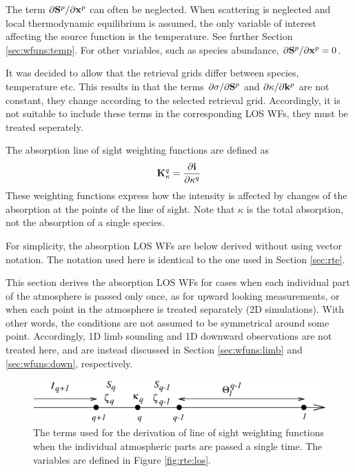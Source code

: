   The term $\partial \mathbf{S}^p/\partial \mathbf{x}^p$ can often be neglected.
  When scattering is neglected and local thermodynamic equilibrium is
  assumed, the only variable of interest affecting the source function
  is the temperature.  See further Section \ref{sec:wfuns:temp}. For
  other variables, such as species abundance, $\partial
  \mathbf{S}^p/\partial \mathbf{x}^p=0$.
  
  It was decided to allow that the retrieval grids differ between
  species, temperature etc. This results in that the terms $\partial
  \sigma/ \partial \mathbf{S}^p$ and $\partial \kappa/ \partial
  \mathbf{k}^p$ are not constant, they change according to the selected
  retrieval grid. Accordingly, it is not suitable to include these terms
  in the corresponding LOS WFs, they must be treated seperately.
  
  

 \label{sec:wfuns:absloswfs}

 The absorption line of sight weighting functions are defined as
 \begin{equation}
   \mathbf{K}_{\kappa}^q =  \frac{\partial\mathbf{i}}{\partial \kappa^q}
  \label{eq:wfuns:loswfs}
 \end{equation}
 These weighting functions express how the intensity is
 affected by changes of the absorption at the points of the line of
 sight. Note that $\kappa$ is the total absorption, not the
 absorption of a single species. 
 
 For simplicity, the absorption LOS WFs are below derived without
 using vector notation. The notation used here is identical to the one
 used in Section \ref{sec:rte}.


 \label{sec:wfuns:single}
 
 This section derives the absorption LOS WFs for cases when each
 individual part of the atmosphere is passed only once, as for upward
 looking measurements, or when each point in the atmosphere is treated
 separately (2D simulations). With other words, the conditions are not
 assumed to be symmetrical around some point. Accordingly, 1D limb
 sounding and 1D downward observations are not treated here, and are
 instead discussed in Section \ref{sec:wfuns:limb} and
 \ref{sec:wfuns:down}, respectively.

 \begin{figure}[t]
  \begin{center}
   \includegraphics*[width=0.95\hsize]{Figs/wf1.eps}
   \caption{The terms used for the derivation of line of sight weighting
            functions when the individual atmospheric parts are passed a
            single time. The variables are defined in Figure 
            \ref{fig:rte:los}.}
   \label{fig:wfuns:single}  
  \end{center}
 \end{figure}

